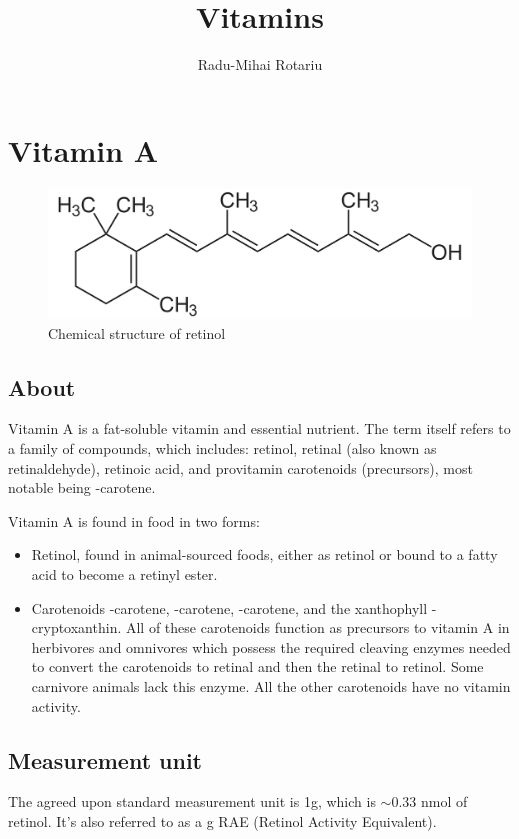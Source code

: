 \documentclass{book}
\begin{document}
\title{Vitamins}
\author{Radu-Mihai Rotariu}
\maketitle
{}
\tableofcontents\newpage
{}

\chapter{Vitamin A}
\begin{figure}[h]
	\caption{Chemical structure of retinol}
	\centering \includegraphics[width=\textwidth]{images/Vitamin_A_chemical_structure}
\end{figure}
\newpage

\section{About}
Vitamin A is a fat-soluble vitamin and essential nutrient. The term itself refers to a family of compounds, which includes: retinol, retinal (also known as retinaldehyde), retinoic acid, and provitamin carotenoids (precursors), most notable being \textbeta-carotene.

Vitamin A is found in food in two forms:
\begin{itemize}
	\item Retinol, found in animal-sourced foods, either as retinol or bound to a fatty acid to become a retinyl ester.
	\item Carotenoids \textalpha-carotene, \textbeta-carotene, \textgamma-carotene, and the xanthophyll \textbeta-cryptoxanthin. All of these carotenoids function as precursors to vitamin A in herbivores and omnivores which possess the required cleaving enzymes needed to convert the carotenoids to retinal and then the retinal to retinol. Some carnivore animals lack this enzyme. All the other carotenoids have no vitamin activity.
\end{itemize}

\section{Measurement unit}
The agreed upon standard measurement unit is 1\textmu g, which is $\sim$0.33 nmol of retinol. It's also referred to as a \textmu g RAE (Retinol Activity Equivalent).
\end{document}
